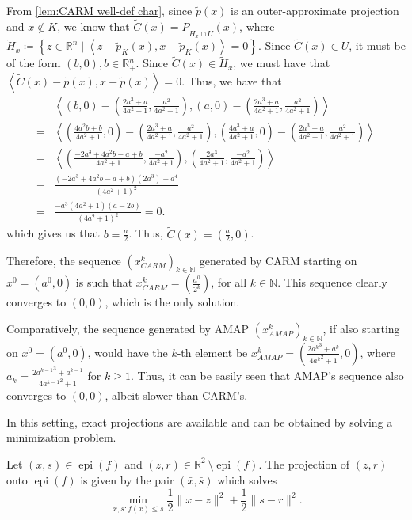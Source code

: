 \documentclass[smallextended,numbook,nospthms]{svjour3}
\theoremstyle{plain}
\theoremstyle{definition}
\def\RR{\mathds R}
\def\NN{\mathds N}
\DeclareMathOperator{\epi}{epi}
\newcommand{\scal}[2]{\left\langle{#1},{#2}  \right\rangle}
\begin{document}
From \cref{lem:CARM well-def char}, since $\tilde{p}(x)$ is an outer-approximate projection and $x \notin K$, we know that $\tilde{C}(x)=P_{\tilde{H}_{x} \cap U}(x)$, where $\tilde{H}_{x}\coloneqq \left\{z \in \RR^{n} \mid \scal{z-\tilde{p}_{K}(x)}{x-\tilde{p}_{K}(x)}=0\right\}$. Since $\tilde{C}(x) \in U$, it must be of the form $(b,0), b \in \RR^{n}_{+}$. Since $\tilde{C}(x) \in \tilde{H}_{x}$, we must have that $\scal{\tilde{C}(x)-\tilde{p}(x)}{x-\tilde{p}(x)}=0$. Thus, we have that
\begin{align}
	&\scal{(b,0)-\left(\frac{2a^3+a}{4a^2+1},\frac{a^2}{4a^2+1}\right)}{(a,0)-\left(\frac{2a^3+a}{4a^2+1},\frac{a^2}{4a^2+1}\right)} \\
	=&\scal{\left(\frac{4a^2b+b}{4a^2+1},0\right)-\left(\frac{2a^3+a}{4a^2+1},\frac{a^2}{4a^2+1}\right)}{\left(\frac{4a^3+a}{4a^2+1},0\right)-\left(\frac{2a^3+a}{4a^2+1},\frac{a^2}{4a^2+1}\right)} \\
	=&\scal{\left(\frac{-2a^3+4a^2b-a+b}{4a^2+1},\frac{-a^2}{4a^2+1}\right)}{\left(\frac{2a^3}{4a^2+1},\frac{-a^2}{4a^2+1}\right)} \\
	=&\frac{(-2a^3+4a^2b-a+b)(2a^3)+a^4}{(4a^2+1)^2} \\
	=&\frac{-a^3(4a^2+1)(a-2b)}{(4a^2+1)^2}=0.
\end{align}
which gives us that $b = \frac{a}{2}$. Thus, $\tilde{C}(x)=\left(\frac{a}{2},0\right)$.

Therefore, the sequence $(x^{k}_{CARM})_{k \in \NN}$ generated by CARM starting on $x^0=(a^0,0)$ is such that $x^{k}_{CARM}=\left(\frac{a^0}{2^k}\right)$, for all $k \in \NN$. This sequence clearly converges to $(0,0)$, which is the only solution.



Comparatively, the sequence generated by AMAP $(x^{k}_{AMAP})_{k \in \NN}$, if also starting on $x^0=(a^0,0)$, would have the $k$-th element be $x^{k}_{AMAP}=\left(\frac{2{a^{k}}^3+{a^{k}}}{4{a^{k}}^2+1},0\right)$, where $a_k=\frac{2{a^{k-1}}^3+{a^{k-1}}}{4{a^{k-1}}^2+1}$ for $k \geq 1$. Thus, it can be easily seen that AMAP's sequence also converges to $(0,0)$, albeit slower than CARM's.

In this setting, exact projections are available and can be obtained by solving a minimization problem.

Let $(x,s) \in \epi(f)$ and $(z,r) \in \RR^{2}_{+} \setminus \epi(f)$. The projection of $(z,r)$ onto $\epi(f)$ is given by the pair $(\bar{x},\bar{s})$ which solves
\[
\min_{x,s: f(x) \leq s} \frac{1}{2} \|x-z\|^2 + \frac{1}{2} \|s-r\|^2. \label{eq:min toy}
\]
\end{document}
